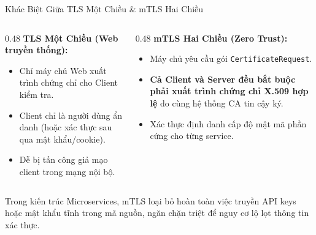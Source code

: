 \begin{frame}{Khác Biệt Giữa TLS Một Chiều \& mTLS Hai Chiều}
  \begin{columns}[T]
    \begin{column}{0.48\textwidth}
      \textbf{TLS Một Chiều (Web truyền thống):}
      \begin{itemize}\small
        \item Chỉ máy chủ Web xuất trình chứng chỉ cho Client kiểm tra.
        \item Client chỉ là người dùng ẩn danh (hoặc xác thực sau qua mật khẩu/cookie).
        \item Dễ bị tấn công giả mạo client trong mạng nội bộ.
      \end{itemize}
    \end{column}
    \begin{column}{0.48\textwidth}
      \textbf{mTLS Hai Chiều (Zero Trust):}
      \begin{itemize}\small
        \item Máy chủ yêu cầu gói \texttt{CertificateRequest}.
        \item \textbf{Cả Client và Server đều bắt buộc phải xuất trình chứng chỉ X.509 hợp lệ} do cùng hệ thống CA tin cậy ký.
        \item Xác thực định danh cấp độ mật mã phần cứng cho từng service.
      \end{itemize}
    \end{column}
  \end{columns}

  \begin{keybox}
    Trong kiến trúc Microservices, mTLS loại bỏ hoàn toàn việc truyền API keys hoặc mật khẩu tĩnh trong mã nguồn, ngăn chặn triệt để nguy cơ lộ lọt thông tin xác thực.
  \end{keybox}
\end{frame}

